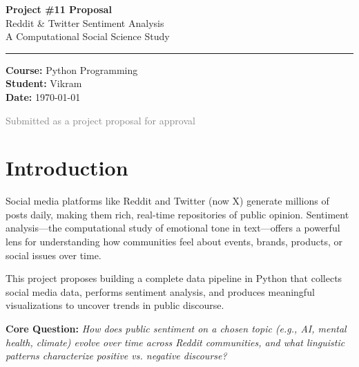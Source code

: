 \documentclass[12pt, letterpaper]{article}
\begin{document}
\begin{titlepage}
    \centering
    \vspace*{2cm}

    {\Huge \textbf{\textcolor{titleblue}{Project \#11 Proposal}}}\\[0.5cm]
    {\LARGE Reddit \& Twitter Sentiment Analysis}\\[0.3cm]
    {\large A Computational Social Science Study}

    \vspace{1.5cm}
    \rule{0.6\textwidth}{0.4pt}
    \vspace{1.5cm}

    {\large \textbf{Course:} Python Programming}\\[0.3cm]
    {\large \textbf{Student:} Vikram}\\[0.3cm]
    {\large \textbf{Date:} \today}

    \vfill
    \textcolor{gray}{\small Submitted as a project proposal for approval}
\end{titlepage}

\tableofcontents
\newpage

\section{Introduction}

Social media platforms like Reddit and Twitter (now X) generate millions of posts daily, making them rich, real-time repositories of public opinion. Sentiment analysis---the computational study of emotional tone in text---offers a powerful lens for understanding how communities feel about events, brands, products, or social issues over time.

This project proposes building a complete data pipeline in Python that collects social media data, performs sentiment analysis, and produces meaningful visualizations to uncover trends in public discourse.

\vspace{0.5em}
\noindent \textbf{Core Question:} \textit{How does public sentiment on a chosen topic (e.g., AI, mental health, climate) evolve over time across Reddit communities, and what linguistic patterns characterize positive vs. negative discourse?}

\end{document}
